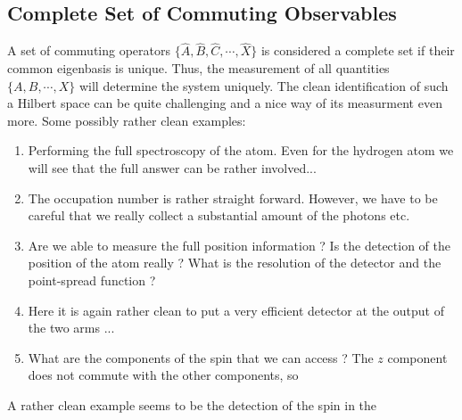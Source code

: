 \subsection{Complete Set of Commuting Observables}

A set of commuting operators $\{\hat{A},\hat{B},\hat{C},\cdots,\hat{X}\}$ is considered a complete set if their common eigenbasis is unique. Thus, the measurement of all quantities $\{A,B,\cdots,X\}$ will determine the system uniquely. The clean identification of such a Hilbert space can be quite challenging and a nice way of its measurment even more. Some possibly rather clean examples:

\begin{enumerate}
\item Performing the full spectroscopy of the atom. Even for the hydrogen atom we will see that the full answer can be rather involved...
\item The occupation number is rather straight forward. However, we have to be careful that we really collect a substantial amount of the photons etc.
\item Are we able to measure the full position information ? Is the detection of the position of the atom really ? What is the resolution of the detector and the point-spread function ?
\item Here it is again rather clean to put a very efficient detector at the output of the two arms ...
\item What are the components of the spin that we can access ? The $z$ component does not commute with the other components, so 
\end{enumerate}

A rather clean example seems to be the detection of the spin in the 